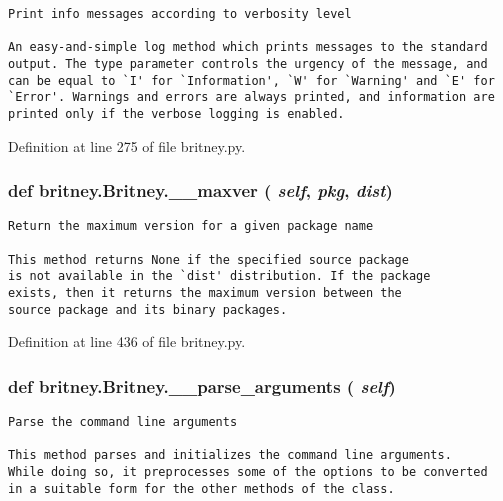 \footnotesize\begin{verbatim}Print info messages according to verbosity level

An easy-and-simple log method which prints messages to the standard
output. The type parameter controls the urgency of the message, and
can be equal to `I' for `Information', `W' for `Warning' and `E' for
`Error'. Warnings and errors are always printed, and information are
printed only if the verbose logging is enabled.
\end{verbatim}
\normalsize
 

Definition at line 275 of file britney.py.
\subsubsection{\setlength{\rightskip}{0pt plus 5cm}def britney.Britney.\_\-\_\-maxver ( {\em self},  {\em pkg},  {\em dist})}\label{classbritney_1_1Britney_0affb1945986a52c61a4492c9732968e}




\footnotesize\begin{verbatim}Return the maximum version for a given package name

This method returns None if the specified source package
is not available in the `dist' distribution. If the package
exists, then it returns the maximum version between the
source package and its binary packages.
\end{verbatim}
\normalsize
 

Definition at line 436 of file britney.py.
\subsubsection{\setlength{\rightskip}{0pt plus 5cm}def britney.Britney.\_\-\_\-parse\_\-arguments ( {\em self})}\label{classbritney_1_1Britney_506f9800068902cf7cac6236b78d1dc4}




\footnotesize\begin{verbatim}Parse the command line arguments

This method parses and initializes the command line arguments.
While doing so, it preprocesses some of the options to be converted
in a suitable form for the other methods of the class.
\end{verbatim}
\normalsize
 

